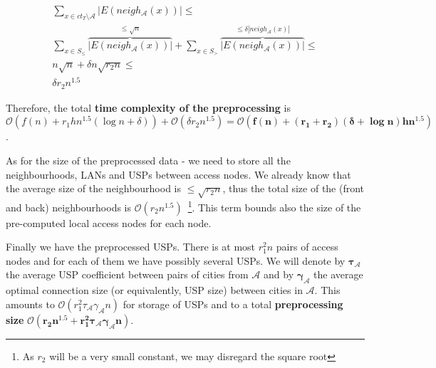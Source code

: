 		\begin{align*}
		\sum_{x \in ct_{T} \setminus \mathcal{A}} |E(neigh_{\mathcal{A}}(x))| \leq \\
		\sum_{x \in S_{\leq}} \overbrace{|E(neigh_{\mathcal{A}}(x))|}^{\leq \sqrt{n}} + 
			\sum_{x \in S_{>}} \overbrace{|E(neigh_{\mathcal{A}}(x))|}^{\leq \delta|neigh_{\mathcal{A}}(x)|} \leq \\
		n \sqrt{n} + \delta n \sqrt{r_{2}n} \leq \\
		\delta r_{2} n^{1.5}
		\end{align*}
		
		\noindent Therefore, the total \textbf{time complexity of the preprocessing} is $\mathcal{O}(f(n) + r_{1}hn^{1.5} (\log n + \delta)) + \mathcal{O}(\delta r_{2} n^{1.5}) = \bm{\mathcal{O}(f(n) + (r_{1} + r_{2}) (\delta + \log n) h n^{1.5})}$.
		
		As for the size of the preprocessed data - we need to store all the neighbourhoods, LANs and USPs between access nodes. We already know that the average size of the neighbourhood is $\leq \sqrt{r_{2}n}$, thus the total size of the (front and back) neighbourhoods is $\mathcal{O}(r_{2} n^{1.5})$~\footnote{As $r_{2}$ will be a very small constant, we may disregard the square root}. This term bounds also the size of the pre-computed local access nodes for each node.
		
		Finally we have the preprocessed USPs. There is at most $r_{1}^{2}n$ pairs of access nodes and for each of them we have possibly several USPs. We will denote by $\bm{\tau_{\mathcal{A}}}$ the average USP coefficient between pairs of cities from $\mathcal{A}$ and by $\bm{\gamma_{\mathcal{A}}}$ the average optimal connection size (or equivalently, USP size) between cities in $\mathcal{A}$. This amounts to $\mathcal{O}(r_{1}^{2} \tau_{\mathcal{A}} \gamma_{\mathcal{A}} n)$ for storage of USPs and to a total \textbf{preprocessing size} $\bm{\mathcal{O}(r_{2} n^{1.5} + r_{1}^{2} \tau_{\mathcal{A}} \gamma_{\mathcal{A}} n)}$.
		
		\begin{figure}[htb]
		\centering
		\end{figure}
		
